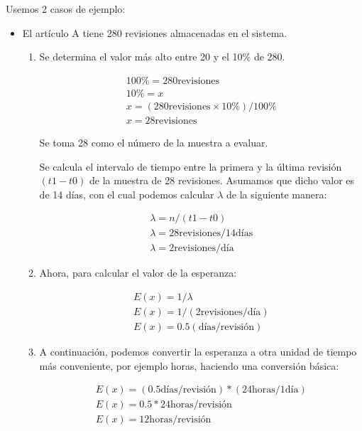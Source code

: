 Usemos 2 casos de ejemplo:

\begin{itemize}

\item El artículo A tiene 280 revisiones almacenadas en el sistema.

  \begin{enumerate}
  \item Se determina el valor más alto entre 20 y el 10\% de 280.

  \begin{gather*}
  100\% = 280 \text{revisiones}\\
  10\% = x\\
  x = (280 \text{revisiones} \times 10\%) / 100\%\\
  x = 28 \text{revisiones}
  \end{gather*}

  Se toma 28 como el número de la muestra a evaluar.

  Se calcula el intervalo de tiempo entre la primera y la última revisión $(t1 - t0)$ de la muestra de 28 revisiones.
  Asumamos que dicho valor es de 14 días, con el cual podemos calcular $\lambda$ de la siguiente manera:

  \begin{gather*}
  \lambda = n / (t1 - t0)\\
  \lambda = 28 \text{revisiones} / 14 \text{días}\\
  \lambda = 2 \text{revisiones} / \text{día}
  \end{gather*}

  \item Ahora, para calcular el valor de la esperanza:

  \begin{gather*}
  E(x)= 1 / \lambda\\
  E(x)= 1 / (2 \text{revisiones} / \text{día})\\
  E(x)= 0.5 (\text{días} / \text{revisión})
  \end{gather*}

  \item A continuación, podemos convertir la esperanza a otra unidad de tiempo más conveniente, por ejemplo horas, haciendo una conversión básica:

  \begin{gather*}
  E(x)= (0.5 \text{días} / \text{revisión}) * (24\text{horas}/1 \text{día})\\
  E(x)= 0.5*24 \text{horas} / \text{revisión} \\
  E(x) = 12 \text{horas}/ \text{revisión}
  \end{gather*}


\end{enumerate}
\end{itemize}
